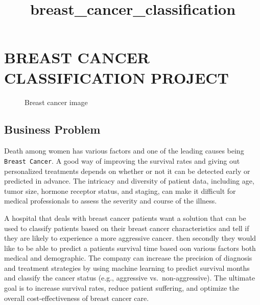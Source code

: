 \documentclass[11pt]{article}
\title{breast\_cancer\_classification}
\begin{document}
    
    \maketitle
    
    

    
    \section{BREAST CANCER CLASSIFICATION
PROJECT}\label{breast-cancer-classification-project}

\begin{figure}
\centering
{}
\caption{Breast cancer image}
\end{figure}

\subsection{Business Problem}\label{business-problem}

Death among women has various factors and one of the leading causes
being \texttt{Breast\ Cancer}. A good way of improving the survival
rates and giving out personalized treatments depends on whether or not
it can be detected early or predicted in advance. The intricacy and
diversity of patient data, including age, tumor size, hormone receptor
status, and staging, can make it difficult for medical professionals to
assess the severity and course of the illness.

A hospital that deals with breast cancer patients want a solution that
can be used to classify patients based on their breast cancer
characteristics and tell if they are likely to experience a more
aggressive cancer. then secondly they would like to be able to predict a
patients survival time based oon various factors both medical and
demographic. The company can increase the precision of diagnosis and
treatment strategies by using machine learning to predict survival
months and classify the cancer status (e.g., aggressive
vs.~non-aggressive). The ultimate goal is to increase survival rates,
reduce patient suffering, and optimize the overall cost-effectiveness of
breast cancer care.
\end{document}
